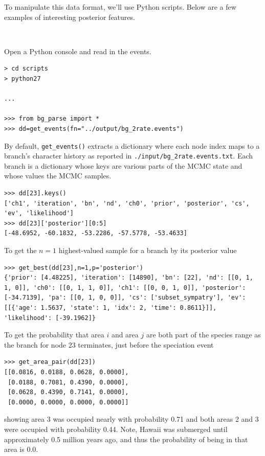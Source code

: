 \documentclass[11pt]{article}
\newcommand{\impmark}{\strut\vadjust{\domark}}
\newcommand{\domark}{%
  \vbox to 0pt{
    \kern-\dp\strutbox
    \smash{\llap{$\rightarrow$\kern1em}}
    \vss
  }%
}
\begin{document}
To manipulate this data format, we'll use Python scripts. Below are a few examples of interesting posterior features.

\noindent \\ \impmark  Open a Python console and read in the events.

\begin{snugshade}
\begin{lstlisting}
> cd scripts
> python27

...

>>> from bg_parse import *
>>> dd=get_events(fn="../output/bg_2rate.events")
\end{lstlisting}
\end{snugshade}

By default, {\tt get\_events()} extracts a dictionary where each node index maps to a branch's character history as reported in {\tt ./input/bg\_2rate.events.txt}. 
Each branch is a dictionary whose keys are various parts of the MCMC state and whose values the MCMC samples.
\begin{snugshade}
\begin{lstlisting}
>>> dd[23].keys()
['ch1', 'iteration', 'bn', 'nd', 'ch0', 'prior', 'posterior', 'cs', 'ev', 'likelihood']
>>> dd[23]['posterior'][0:5]
[-48.6952, -60.1832, -53.2286, -57.5778, -53.4633]
\end{lstlisting}
\end{snugshade}

To get the $n=1$ highest-valued sample for a branch by its posterior value
\begin{snugshade}
\begin{lstlisting}
>>> get_best(dd[23],n=1,p='posterior')
{'prior': [4.48225], 'iteration': [14890], 'bn': [22], 'nd': [[0, 1, 1, 0]], 'ch0': [[0, 1, 1, 0]], 'ch1': [[0, 0, 1, 0]], 'posterior': [-34.7139], 'pa': [[0, 1, 0, 0]], 'cs': ['subset_sympatry'], 'ev': [[{'age': 1.5637, 'state': 1, 'idx': 2, 'time': 0.8611}]], 'likelihood': [-39.1962]}
\end{lstlisting}
\end{snugshade}

To get the probability that area $i$ and area $j$ are both part of the species range as the branch for node 23 terminates, just before the speciation event
\begin{snugshade}
\begin{lstlisting}
>>> get_area_pair(dd[23])
[[0.0816, 0.0188, 0.0628, 0.0000],
 [0.0188, 0.7081, 0.4390, 0.0000],
 [0.0628, 0.4390, 0.7141, 0.0000],
 [0.0000, 0.0000, 0.0000, 0.0000]]
\end{lstlisting}
\end{snugshade}
showing area 3 was occupied nearly with probability 0.71 and both areas 2 and 3 were occupied with probability 0.44.
Note, Hawaii was submerged until approximately 0.5 million years ago, and thus the probability of being in that area is 0.0.
\end{document}
